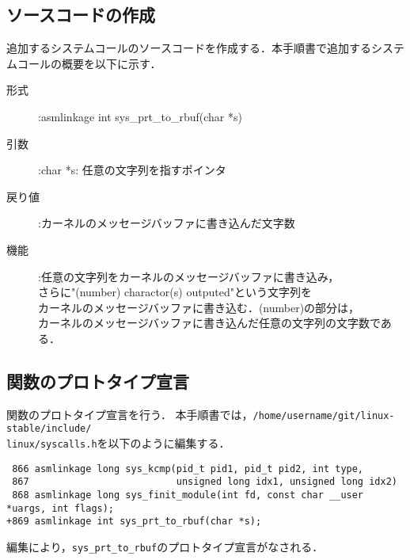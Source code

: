 \documentclass[12pt]{jsarticle}
\begin{document}
\subsection{ソースコードの作成}
追加するシステムコールのソースコードを作成する．本手順書で追加するシステムコールの概要を以下に示す．
\newpage
\begin{description}
  \item[形式] :asmlinkage int sys\_prt\_to\_rbuf(char *s)
  \item[引数] :char *s: 任意の文字列を指すポインタ
  \item[戻り値] :カーネルのメッセージバッファに書き込んだ文字数
  \item[機能] :任意の文字列をカーネルのメッセージバッファに書き込み，\\
      さらに"(number) charactor(s) outputed"という文字列を\\
      カーネルのメッセージバッファに書き込む．(number)の部分は，\\
      カーネルのメッセージバッファに書き込んだ任意の文字列の文字数である．\\
\end{description}

\subsection{関数のプロトタイプ宣言}
関数のプロトタイプ宣言を行う．
本手順書では，\verb|/home/username/git/linux-stable/include/|\\
\verb|linux/syscalls.h|を以下のように編集する．
\begin{verbatim}
 866 asmlinkage long sys_kcmp(pid_t pid1, pid_t pid2, int type,
 867                          unsigned long idx1, unsigned long idx2)
 868 asmlinkage long sys_finit_module(int fd, const char __user *uargs, int flags);
+869 asmlinkage int sys_prt_to_rbuf(char *s);
\end{verbatim}
編集により，\verb|sys_prt_to_rbuf|のプロトタイプ宣言がなされる．
\end{document}
